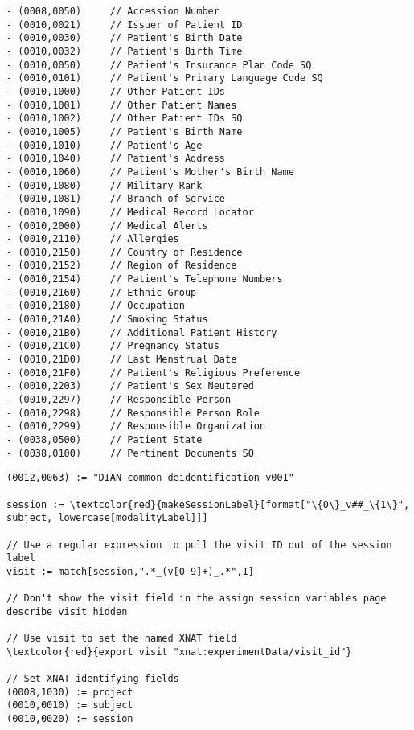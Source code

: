\documentclass[handout]{beamer}
\begin{document}
\begin{frame}[fragile]
\tiny
\begin{verbatim}
- (0008,0050)     // Accession Number
- (0010,0021)     // Issuer of Patient ID
- (0010,0030)     // Patient's Birth Date
- (0010,0032)     // Patient's Birth Time
- (0010,0050)     // Patient's Insurance Plan Code SQ
- (0010,0101)     // Patient's Primary Language Code SQ
- (0010,1000)     // Other Patient IDs
- (0010,1001)     // Other Patient Names
- (0010,1002)     // Other Patient IDs SQ
- (0010,1005)     // Patient's Birth Name
- (0010,1010)     // Patient's Age
- (0010,1040)     // Patient's Address
- (0010,1060)     // Patient's Mother's Birth Name
- (0010,1080)     // Military Rank
- (0010,1081)     // Branch of Service
- (0010,1090)     // Medical Record Locator
- (0010,2000)     // Medical Alerts
- (0010,2110)     // Allergies
- (0010,2150)     // Country of Residence
- (0010,2152)     // Region of Residence
- (0010,2154)     // Patient's Telephone Numbers
- (0010,2160)     // Ethnic Group
- (0010,2180)     // Occupation
- (0010,21A0)     // Smoking Status
- (0010,21B0)     // Additional Patient History
- (0010,21C0)     // Pregnancy Status
- (0010,21D0)     // Last Menstrual Date
- (0010,21F0)     // Patient's Religious Preference
- (0010,2203)     // Patient's Sex Neutered
- (0010,2297)     // Responsible Person
- (0010,2298)     // Responsible Person Role
- (0010,2299)     // Responsible Organization
- (0038,0500)     // Patient State
- (0038,0100)     // Pertinent Documents SQ
\end{verbatim}
\end{frame}

\begin{frame}[fragile]
\tiny
\begin{Verbatim}[commandchars=\\\{\}]
(0012,0063) := "DIAN common deidentification v001"

session := \textcolor{red}{makeSessionLabel}[format["\{0\}_v##_\{1\}", subject, lowercase[modalityLabel]]]

// Use a regular expression to pull the visit ID out of the session label
visit := match[session,".*_(v[0-9]+)_.*",1]

// Don't show the visit field in the assign session variables page
describe visit hidden                           

// Use visit to set the named XNAT field
\textcolor{red}{export visit "xnat:experimentData/visit_id"}

// Set XNAT identifying fields
(0008,1030) := project
(0010,0010) := subject
(0010,0020) := session
\end{Verbatim}
\end{frame}
\end{document}
